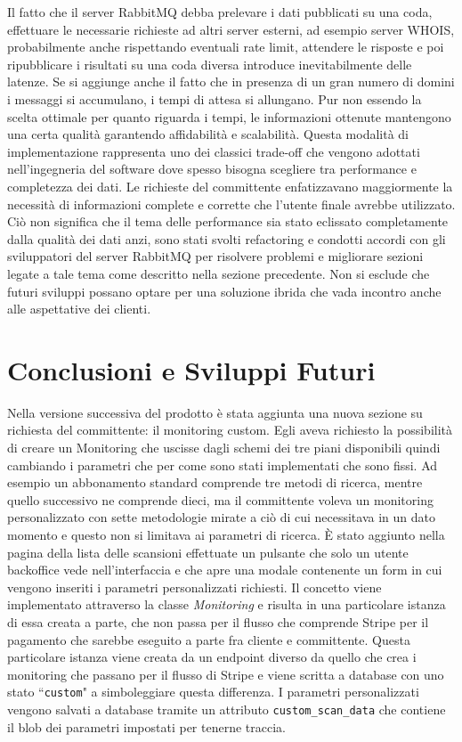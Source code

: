 \documentclass[target=bach,aauheader=,style=]{thud}
\begin{document}
Il fatto che il server RabbitMQ debba prelevare i dati pubblicati su una coda, effettuare le necessarie richieste ad altri server esterni, ad esempio server WHOIS, probabilmente anche rispettando eventuali
rate limit, attendere le risposte e poi ripubblicare i risultati su una coda diversa introduce inevitabilmente delle latenze. Se si aggiunge anche il fatto che in presenza di un gran numero
di domini i messaggi si accumulano, i tempi di attesa si allungano. Pur non essendo la scelta ottimale per quanto riguarda i tempi, le informazioni ottenute mantengono una certa qualità garantendo
affidabilità e scalabilità. Questa modalità di implementazione rappresenta uno dei classici trade-off che vengono adottati nell'ingegneria del software dove spesso bisogna scegliere tra performance e
completezza dei dati. Le richieste del committente enfatizzavano maggiormente la necessità di informazioni complete e corrette che l'utente finale avrebbe utilizzato. Ciò non significa che il tema delle
performance sia stato eclissato completamente dalla qualità dei dati anzi, sono stati svolti refactoring e condotti accordi con gli sviluppatori del server RabbitMQ per risolvere problemi e
migliorare sezioni legate a tale tema come descritto nella sezione precedente. Non si esclude che futuri sviluppi possano optare per una soluzione ibrida che vada incontro anche alle aspettative
dei clienti.

\chapter{Conclusioni e Sviluppi Futuri}

Nella versione successiva del prodotto è stata aggiunta una nuova sezione su richiesta del committente: il monitoring custom. Egli aveva richiesto la possibilità di creare un Monitoring che uscisse
dagli schemi dei tre piani disponibili quindi cambiando i parametri che per come sono stati implementati che sono fissi. Ad esempio un abbonamento standard comprende tre metodi di ricerca, mentre quello
successivo ne comprende dieci, ma il committente voleva un monitoring personalizzato con sette metodologie mirate a ciò di cui necessitava in un dato momento e questo non si limitava ai parametri di
ricerca. È stato aggiunto nella pagina della lista delle scansioni effettuate un pulsante che solo un utente backoffice vede nell'interfaccia e che apre una modale contenente un form in cui vengono inseriti
i parametri personalizzati richiesti. Il concetto viene implementato attraverso la classe \textit{Monitoring} e risulta in una particolare istanza di essa creata a parte, che non passa per il flusso
che comprende Stripe per il pagamento che sarebbe eseguito a parte fra cliente e committente. Questa particolare istanza viene creata da un endpoint diverso da quello che crea i monitoring che passano
per il flusso di Stripe e viene scritta a database con uno stato ``\texttt{custom}" a simboleggiare questa differenza. I parametri personalizzati vengono salvati a database tramite un attributo
\texttt{custom\_scan\_data} che contiene il blob dei parametri impostati per tenerne traccia.
\end{document}
